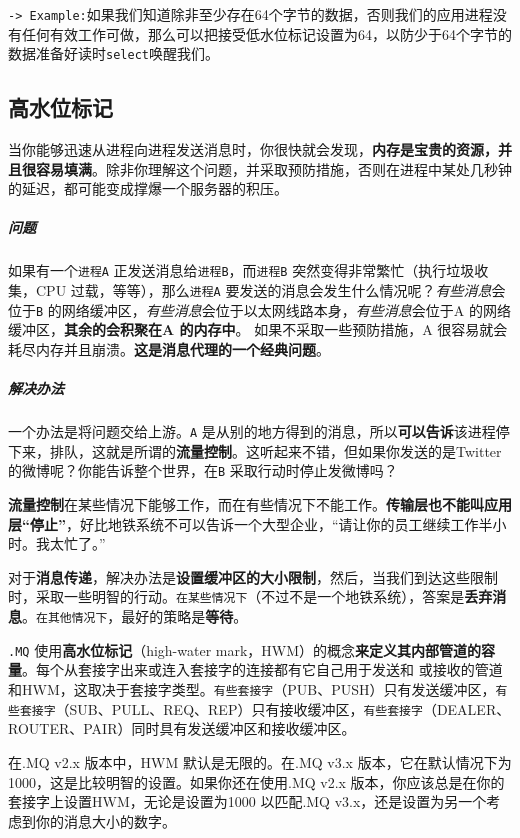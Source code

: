 \documentclass[UTF8,a4paper,8pt]{ctexbook}
\begin{document}
			\verb|-> Example:|如果我们知道除非至少存在64个字节的数据，否则我们的应用进程没有任何有效工作可做，那么可以把接受低水位标记设置为64，以防少于64个字节的数据准备好读时\verb|select|唤醒我们。
		\subsection{高水位标记}
			当你能够迅速从进程向进程发送消息时，你很快就会发现，\textbf{内存是宝贵的资源，并且很容易填满}。除非你理解这个问题，并采取预防措施，否则在进程中某处几秒钟的延迟，都可能变成撑爆一个服务器的积压。
			
			\subparagraph{问题}如果有一个\verb|进程A| 正发送消息给\verb|进程B|，而\verb|进程B| 突然变得非常繁忙（执行垃圾收集，CPU 过载，等等），那么\verb|进程A| 要发送的消息会发生什么情况呢？\textit{有些消息}会位于\verb|B| 的网络缓冲区，\textit{有些消息}会位于以太网线路本身，\textit{有些消息}会位于A 的网络缓冲区，\textbf{其余的}\textbf{会积聚在A 的内存中}。
			如果不采取一些预防措施，A 很容易就会耗尽内存并且崩溃。\textbf{这是消息代理的一个经典问题}。
		
			\subparagraph{解决办法}一个办法是将问题交给上游。\verb|A| 是从别的地方得到的消息，所以\textbf{可以告诉}该进程停下来，排队，这就是所谓的\textbf{流量控制}。这听起来不错，但如果你发送的是Twitter 的微博呢？你能告诉整个世界，在\verb|B| 采取行动时停止发微博吗？
			
			\textbf{流量控制}在某些情况下能够工作，而在有些情况下不能工作。\textbf{传输层也不能叫应用层“停止”}，好比地铁系统不可以告诉一个大型企业，“请让你的员工继续工作半小时。我太忙了。”
			
			对于\textbf{消息传递}，解决办法是\textbf{设置缓冲区的大小限制}，然后，当我们到达这些限制时，采取一些明智的行动。\verb|在某些情况下|（不过不是一个地铁系统），答案是\textbf{丢弃消息}。\verb|在其他情况下|，最好的策略是\textbf{等待}。
			
			\verb|.MQ| 使用\textbf{高水位标记}（high-water mark，HWM）的概念\textbf{来定义其内部管道的容量}。每个从套接字出来或连入套接字的连接都有它自己用于发送和 或接收的管道和HWM，这取决于套接字类型。\verb|有些套接字|（PUB、PUSH）只有发送缓冲区，\verb|有些套接字|（SUB、PULL、REQ、REP）只有接收缓冲区，\verb|有些套接字|（DEALER、ROUTER、PAIR）同时具有发送缓冲区和接收缓冲区。
			
			在.MQ v2.x 版本中，HWM 默认是无限的。在.MQ v3.x 版本，它在默认情况下为1000，这是比较明智的设置。如果你还在使用.MQ v2.x 版本，你应该总是在你的套接字上设置HWM，无论是设置为1000 以匹配.MQ v3.x，还是设置为另一个考虑到你的消息大小的数字。
			
\end{document}
